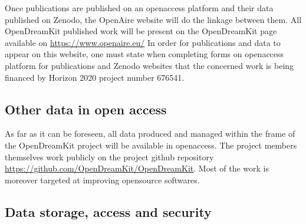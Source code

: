 \documentclass{deliverablereport}
\begin{document}
Once publications are published on an openaccess platform and their data published on Zenodo, the OpenAire website will do the linkage between them. All OpenDreamKit published work will be present on the OpenDreamKit page available on \href{https://www.openaire.eu/}{https://www.openaire.eu/}
In order for publications and data to appear on this website, one must state when completing forms on openaccess platform for publications and Zenodo websites that the concerned work is being financed by Horizon 2020 project number 676541.



\subsection{Other data in open access}


As far as it can be foreseen, all data produced and managed within the frame of the OpenDreamKit project will be available in openaccess. The project members themselves work publicly on the project github repository \url{https://github.com/OpenDreamKit/OpenDreamKit}.
Most of the work is moreover targeted at improving opensource softwares.



\subsection{Data storage, access and security}
\end{document}
